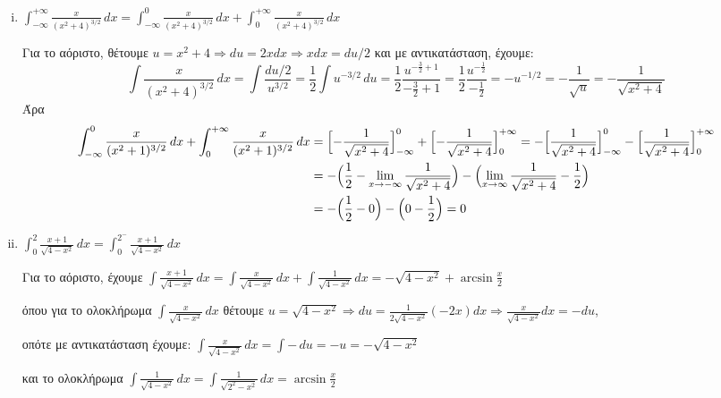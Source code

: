 \begin{enumerate}[i)]
  \item $ \boxed{\int _{- \infty}^{+ \infty} \frac{x}{(x^{2}+4)^{3/2}} \,{dx}} = \int _{- \infty
    }^{0} \frac{x}{(x^{2}+4)^{3/2}} \,{dx} + \int _{0}^{+ \infty} 
    \frac{x}{(x^{2}+4)^{3/2}} \,{dx} $
    \begin{solution}
      Για το αόριστο, θέτουμε $ u = x^{2}+4 \Rightarrow du = 2x dx \Rightarrow x dx = du
      /2 $ και με 
      αντικατάσταση, έχουμε:
      \[
        \int \frac{x}{(x^{2}+4)^{3/2}} \,{dx} = \int \frac{du/2}{u^{3/2}} = 
        \frac{1}{2} \int u^{-3/2} \,{du} = \frac{1}{2} \frac{u^{- \frac{3}{2}
        + 1}}{- \frac{3}{2} + 1} = \frac{1}{2} \frac{u^{- \frac{1}{2}}}{-
        \frac{1}{2}} = - u^{-1/2} = - \frac{1}{\sqrt{u}} = - \frac{1}{\sqrt{x^{2}+4}} 
      \] 
      Άρα
      \begin{align*}
        \int _{- \infty}^{0} \frac{x}{(x^{2}+1)^{3/2}} \,{dx} + 
        \int _{0}^{+ \infty} \frac{x}{(x^{2}+1)^{3/2}} \,{dx} 
    &= 
    \Bigl[- \frac{1}{\sqrt{x^{2}+4}} \Bigr]_{- \infty}^{0} + 
    \Bigl[- \frac{1}{\sqrt{x^{2}+4}} \Bigr]_{0}^{+ \infty} = 
    -\Bigl[\frac{1}{\sqrt{x^{2}+4}} \Bigr]_{- \infty}^{0} - 
    \Bigl[\frac{1}{\sqrt{x^{2}+4}} \Bigr]_{0}^{+ \infty} \\ 
    &= -\Bigl(\frac{1}{2} - \lim_{x \to - \infty} \frac{1}{\sqrt{x^{2}+4}}\Bigr) - 
    \Bigl( \lim_{x \to \infty} \frac{1}{\sqrt{x^{2}+4}} - \frac{1}{2}\Bigr) \\ 
    &= -\Bigl(\frac{1}{2} -0\Bigr)-\Bigl(0- \frac{1}{2}\Bigr) = 0
      \end{align*}
    \end{solution}

  \item $ \boxed{\int _{0}^{2} \frac{x+1}{\sqrt{4-x^2}} \,{dx}} = \int _{0}^{2^-}
    \frac{x+1}{\sqrt{4-x^{2}}} \,{dx} $ 
    \begin{solution}
      Για το αόριστο, έχουμε $ \int \frac{x+1}{\sqrt{4- x^{2}}} \,{dx} = 
      \int \frac{x}{\sqrt{4-x^{2}}} \,{dx} + \int \frac{1}{\sqrt{4-x^{2}}} \,{dx} 
      = - \sqrt{4-x^{2}} + \arcsin{\frac{x}{2}} $ 

      όπου για το ολοκλήρωμα $ \int \frac{x}{\sqrt{4-x^{2}}} \,{dx}  $ θέτουμε $ u =
      \sqrt{4-x^{2}} \Rightarrow du = \frac{1}{2 \sqrt{4-x^{2}}} (-2x)dx \Rightarrow
      \frac{x}{\sqrt{4-x^{2}}} dx = - du $, 

      οπότε με αντικατάσταση έχουμε: 
    $\int \frac{x}{\sqrt{4-x^{2}}} \,{dx} = \int - \,{du} = -u = - \sqrt{4-x^{2}}$ 

    και το ολοκλήρωμα $ \int \frac{1}{\sqrt{4-x^{2}}} \,{dx} = \int
  \frac{1}{\sqrt{2^{2}-x^{2}}} \,{dx} = \arcsin{\frac{x}{2}} $


\end{solution}
\end{enumerate}

